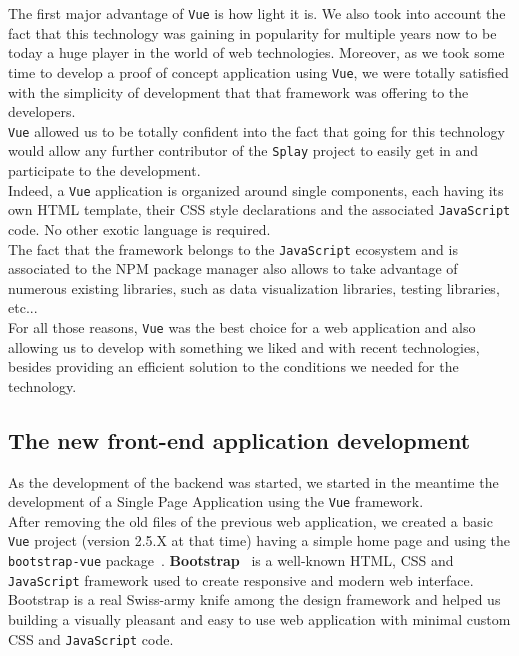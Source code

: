 \documentclass{eplmastersthesis}
\begin{document}
        The first major advantage of \texttt{Vue} is how light it is. We also took into
        account the fact that this technology was gaining in popularity for
        multiple years now to be today a huge player in the world of web
        technologies. Moreover, as we took some time to develop a proof
        of concept application using \texttt{Vue}, we were totally satisfied with the
        simplicity of development that that framework was offering to the
        developers.\\
        \texttt{Vue} allowed us to be totally confident into the fact
        that going for this technology would allow any further contributor
        of the \texttt{Splay} project to easily get in and participate to the
        development.\\
        Indeed, a \texttt{Vue} application is organized around single components, each
        having its own HTML template, their CSS style declarations and
        the associated \texttt{JavaScript} code. No other exotic language is required.\\
        The fact that the framework belongs to the \texttt{JavaScript} ecosystem and is %
        associated to the NPM package manager also allows to take advantage of
        numerous existing libraries, such as data visualization libraries,
        testing libraries, etc...\\

        For all those reasons, \texttt{Vue} was the best choice for a
        web application and also allowing us to develop with something
        we liked and with recent technologies, besides providing an efficient
        solution to the conditions we needed for the technology.

      \subsection{The new front-end application development}

        As the development of the backend was started, we started in the
        meantime the development of a Single Page Application using
        the \texttt{Vue} framework.\\

        After removing the old files of the previous web application, we
        created a basic \texttt{Vue} project (version 2.5.X at that time) having a
        simple home page and using the \texttt{bootstrap-vue} package~\cite{BootstrapVue}. 
        \textbf{Bootstrap}~\cite{Bootstrap} is a
        well-known HTML, CSS and \texttt{JavaScript} framework used to create responsive
        and modern web interface.\\
        Bootstrap is a real Swiss-army knife among the design framework
        and helped us building a visually pleasant and easy to use
        web application with minimal custom CSS and \texttt{JavaScript} code.\\
\end{document}
